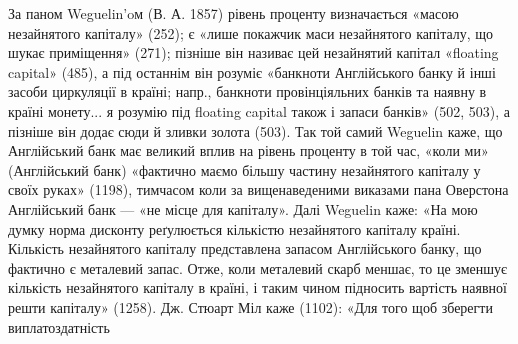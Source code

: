 За паном Weguelin’oм (В. А. 1857) рівень проценту визначається «масою
незайнятого капіталу» (252); є «лише покажчик маси незайнятого капіталу, що
шукає приміщення» (271); пізніше він називає цей незайнятий капітал «floating
capital» (485), а під останнім він розуміє «банкноти Англійського банку й інші
засоби циркуляції в країні; напр., банкноти провінціяльних банків та наявну в
країні монету... я розумію під floating capital також і запаси банків» (502, 503),
а пізніше він додає сюди й зливки золота (503). Так той самий Weguelin каже, що
Англійський банк має великий вплив на рівень проценту в той час, «коли ми» (Англійський
банк) «фактично маємо більшу частину незайнятого капіталу у своїх
руках» (1198), тимчасом коли за вищенаведеними виказами пана Оверстона Англійський
банк — «не місце для капіталу». Далі Weguelin каже: «На мою думку
норма дисконту реґулюється кількістю незайнятого капіталу країні. Кількість незайнятого
капіталу представлена запасом Англійського банку, що фактично є металевий
запас. Отже, коли металевий скарб меншає, то це зменшує кількість незайнятого
капіталу в країні, і таким чином підносить вартість наявної решти капіталу»
(1258). Дж. Стюарт Міл каже (1102): «Для того щоб зберегти виплатоздатність
\parbreak{}  %
